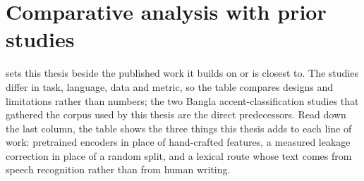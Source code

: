 \section{Comparative analysis with prior studies}
\label{sec:res-comparative}

 sets this thesis beside the published work it builds on
or is closest to. The studies differ in task, language, data and metric, so the
table compares designs and limitations rather than numbers; the two Bangla
accent-classification studies that gathered the corpus used by this thesis are
the direct predecessors. Read down the last column, the table shows the three
things this thesis adds to each line of work: pretrained encoders in place of
hand-crafted features, a measured leakage correction in place of a random
split, and a lexical route whose text comes from speech recognition rather than
from human writing.

